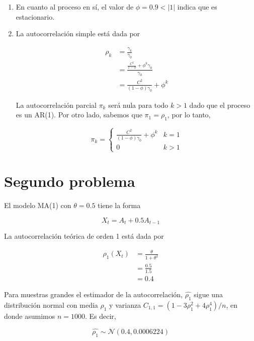 \documentclass[a4paper,10pt]{article}
\begin{document}
\begin{enumerate}[label=(\alph*)]
\item En cuanto al proceso en sí, el valor de $\phi = 0.9 < |1|$ indica que es estacionario.

\item La autocorrelación simple está dada por

\begin{align*}
 \rho_k &= \frac{\gamma_k}{\gamma_0} \\
 &= \frac{\frac{C^2}{1 - \phi} + \phi^k \gamma_0}{\gamma_0} \\
 &= \frac{C^2}{(1 - \phi)\gamma_0} + \phi^k
\end{align*}

La autocorrelación parcial $\pi_k$ será nula para todo $k > 1$ dado que el proceso es un AR(1). Por otro lado, sabemos que $\pi_1 = \rho_1$, por lo tanto,

\[ \pi_k = \begin{cases} 
      \frac{C^2}{(1 - \phi)\gamma_0} + \phi^k & k = 1 \\
      0 & k > 1 
   \end{cases}
\]

\end{enumerate}



\section{Segundo problema}

El modelo MA(1) con $\theta = 0.5$ tiene la forma

\begin{equation*}
 X_t = A_t + 0.5 A_{t-1}
\end{equation*}

La autocorrelación teórica de orden 1 está dada por

\begin{align}
 \rho_1(X_t) &= \frac{\theta}{1 + \theta^2}\\
 &= \frac{0.5}{1.5} \\
 &= 0.4
\end{align}

Para muestras grandes el estimador de la autocorrelación, $\hat{\rho_1}$ sigue una distribución normal con media $\rho_1$ y varianza 
$C_{1,1} = (1 - 3\rho^2_1 + 4\rho^4_1)/n$, en donde asumimos $n=1000$. Es decir,

\begin{equation}
 \hat{\rho_1} \sim \mathscr{N}(0.4, 0.0006224)
\end{equation}
\end{document}
